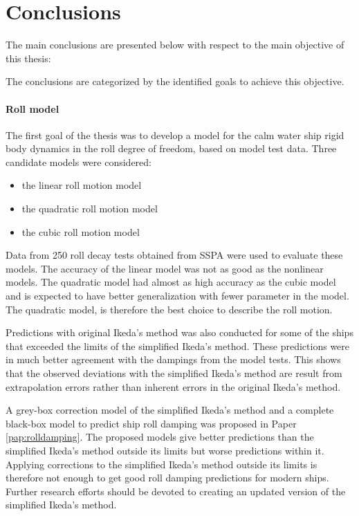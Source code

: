 \chapter{Conclusions\label{ch:conclusions}}
The main conclusions are presented below with respect to the main objective of this thesis:
\begin{quote} 
\expandafter\MakeUppercase \objective
\end{quote}
\noindent The conclusions are categorized by the identified goals to achieve this objective.

\subsubsection*{Roll model}
The first goal of the thesis was to develop a model for the calm water ship rigid body dynamics in the roll degree of freedom, based on model test data. 
Three candidate models were considered: 
\begin{itemize}
    \item the linear roll motion model
    \item the quadratic roll motion model
    \item the cubic roll motion model
\end{itemize}
\noindent Data from 250 roll decay tests obtained from SSPA were used to evaluate these models. The accuracy of the linear model was not as good as the nonlinear models. The quadratic model had almost as high accuracy as the cubic model and is expected to have better generalization with fewer parameter in the model. The quadratic model, is therefore the best choice to describe the roll motion. 

Predictions with original Ikeda's method was also conducted for some of the ships that exceeded the limits of the simplified Ikeda's method. These predictions were in much better agreement with the dampings from the model tests. This shows that the observed deviations with the simplified Ikeda's method are result from extrapolation errors rather than inherent 
errors in the original Ikeda's method.

A grey-box correction model of the simplified Ikeda's method and a complete black-box model to predict ship roll damping was proposed in Paper \ref{pap:rolldamping}. The proposed models give better predictions than the simplified Ikeda's method outside its limits but worse predictions within it. Applying corrections to the simplified Ikeda's method outside its limits is therefore not enough to get good roll damping predictions for modern ships. Further
research efforts should be devoted to creating an updated version of the simplified Ikeda's method.

